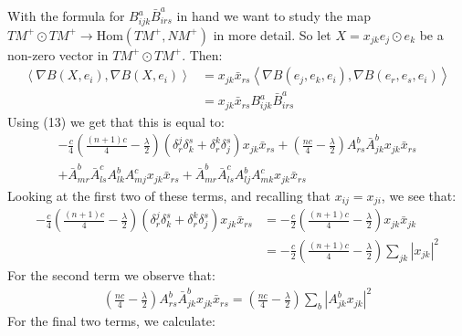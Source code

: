 \documentclass[11pt]{amsart}
\def \la { \left\langle }
\def \ra { \right\rangle }
\def \Hom{ \text{Hom} }
\def \TMp{ TM^{+} }
\def \NMp{ NM^+ }
\theoremstyle{definition}
\begin{document}
With the formula for $B^a_{ijk} \bar{B}^a_{irs}$ in hand we want to study the map $\TMp \odot \TMp \rightarrow \Hom( \TMp, \NMp )$ in more detail.  So let $X = x_{jk} e_j \odot e_k$ be a non-zero vector in $\TMp \odot \TMp$. Then:
%
\begin{align*}
\la \nabla B (X, e_i), \nabla B(X, e_i) \ra &=  x_{jk} \bar{x}_{rs} \la \nabla B(e_j, e_k, e_i), \nabla B(e_r, e_s, e_i) \ra \\
&= x_{jk} \bar{x}_{rs} B^a_{ijk} \bar{B}^a_{irs}
\end{align*}
%
Using (13) we get that this is equal to:
%
\begin{align*}
- \frac{c}{4} \left( \frac{(n+1)c}{4} - \frac{\lambda}{2} \right)\left( \delta^j_r \delta^s_k + \delta^k_r \delta^s_j \right) x_{jk} \bar{x}_{rs} + \left( \frac{nc}{4} - \frac{\lambda}{2} \right) A^b_{rs} \bar{A}^b_{jk} x_{jk} \bar{x}_{rs} \\
+ \bar{A}^b_{mr} \bar{A}^c_{ls} A^b_{lk} A^c_{mj} x_{jk} \bar{x}_{rs} + \bar{A}^b_{mr} \bar{A}^c_{ls} A^b_{lj} A^c_{mk} x_{jk} \bar{x}_{rs}
\end{align*}
%
Looking at the first two of these terms, and recalling that $x_{ij} = x_{ji}$, we see that:
%
\begin{align*}
- \frac{c}{4} \left( \frac{(n+1)c}{4} - \frac{\lambda}{2} \right) \left( \delta^j_r \delta^s_k + \delta^k_r \delta^s_j \right) x_{jk} \bar{x}_{rs} &= - \frac{c}{2} \left( \frac{(n+1)c}{4} - \frac{\lambda}{2} \right) x_{jk} \bar{x}_{jk} \\
&= - \frac{c}{2} \left( \frac{(n+1)c}{4} - \frac{\lambda}{2} \right) \sum_{jk} \left| x_{jk} \right|^2
\end{align*}
%
For the second term we observe that:
%
\begin{align*}
\left( \frac{nc}{4} - \frac{\lambda}{2} \right) A^b_{rs} \bar{A}^b_{jk} x_{jk} \bar{x}_{rs} = \left( \frac{nc}{4} - \frac{\lambda}{2} \right) \sum_{b} \left| A^b_{jk} x_{jk} \right|^2
\end{align*}
%
For the final two terms, we calculate:
%
\end{document}
